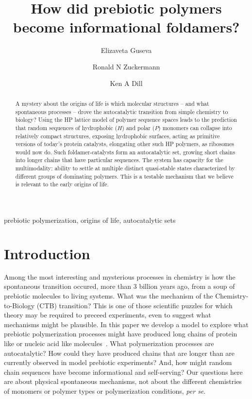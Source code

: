 \documentclass[5p,times]{elsarticle}
\begin{document}
\begin{frontmatter}
\title{How did prebiotic polymers become informational foldamers?}
\author[addr1]{Elizaveta Guseva}
\author[addr2]{Ronald N Zuckermann}
\author[addr1]{Ken A Dill}
\address[addr1]{Laufer Center for Physical and Quantitative Biology, and Departments of Physics \& 
Astronomy and Chemistry, Stony Brook University, Stony Brook, NY, (United States)}
\address[addr2]{Lawrence Berkeley National Laboratory (LBNL), Berkeley, CA (United States)}
% 
\begin{abstract}
A mystery about the origins of life is which molecular structures -- and what spontaneous 
processes -- drove the autocatalytic transition from simple chemistry to biology?  Using the HP 
lattice model of polymer sequence spaces leads to the prediction that random sequences of 
hydrophobic ($H$) and 
polar ($P$) monomers can collapse into relatively compact structures, exposing hydrophobic 
surfaces, acting as primitive versions of today's protein catalysts, elongating other such HP 
polymers, as ribosomes would now do. Such foldamer-catalysts form an autocatalytic set, growing 
short chains into longer chains that have particular sequences. The system has capacity for the 
multimodality: ability to settle at multiple distinct 
quasi-stable states characterized by different groups of dominating polymers. This is a testable 
mechanism that we believe is relevant to the early origins of life.
\end{abstract}
% 
\begin{keyword}
prebiotic polymerization, origins of life, autocatalytic sets
\end{keyword}
 \end{frontmatter}
\section{Introduction} 

 Among the most interesting and mysterious processes in chemistry is how the spontaneous 
transition 
occured, more than 3 billion years ago, from a soup of prebiotic molecules to living systems.  
What 
was the mechanism of the Chemistry-to-Biology (CTB) transition?  This is one of those scientific 
puzzles for which theory may be required to preceed experiments, even to suggest what mechanisms 
might be plausible.  In this paper we develop a model to 
explore what prebiotic polymerization processes might have produced long chains of protein like or 
nucleic acid like molecules~\cite{Joyce1987,Abel2005}.  What polymerization processes are 
autocatalytic?  How could they have produced chains that are longer than are currently observed in 
model prebiotic experiments?  And, how might random chain sequences have become informational and 
self-serving?  Our questions here are about physical spontaneous mechanisms, not about the 
different chemistries of monomers or polymer types or polymerization conditions, \emph{per se}.  
 
\end{document}
